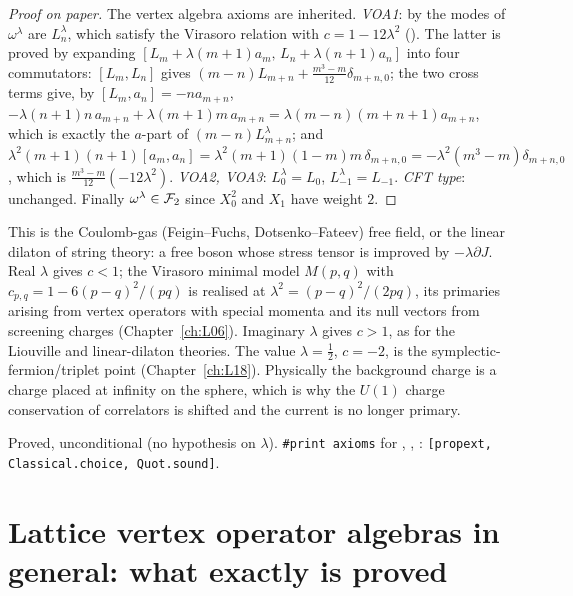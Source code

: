 \begin{proof}[Proof on paper]
The vertex algebra axioms are inherited. \emph{VOA1}: by  the modes of $\omega^\lambda$ are
$L^\lambda_n$, which satisfy the Virasoro relation with $c=1-12\lambda^2$ (). The latter is
proved by expanding $[L_m+\lambda(m+1)a_m,\,L_n+\lambda(n+1)a_n]$ into four commutators: $[L_m,L_n]$ gives
$(m-n)L_{m+n}+\frac{m^3-m}{12}\delta_{m+n,0}$; the two cross terms give, by $[L_m,a_n]=-na_{m+n}$,
$-\lambda(n+1)n\,a_{m+n}+\lambda(m+1)m\,a_{m+n}=\lambda(m-n)(m+n+1)a_{m+n}$, which is exactly the $a$-part of $(m-n)L^\lambda_{m+n}$; and
$\lambda^2(m+1)(n+1)[a_m,a_n]=\lambda^2(m+1)(1-m)m\,\delta_{m+n,0}=-\lambda^2(m^3-m)\delta_{m+n,0}$, which is
$\frac{m^3-m}{12}(-12\lambda^2)$. \emph{VOA2, VOA3}: $L^\lambda_0=L_0$, $L^\lambda_{-1}=L_{-1}$. \emph{CFT type}:
unchanged. Finally $\omega^\lambda\in\mathcal{F}_2$ since $X_0^2$ and $X_1$ have weight $2$.
\end{proof}

\begin{physics}
This is the Coulomb-gas (Feigin--Fuchs, Dotsenko--Fateev) free field, or the linear dilaton of string
theory: a free boson whose stress tensor is improved by $-\lambda\partial J$. Real $\lambda$ gives $c<1$; the
Virasoro minimal model $M(p,q)$ with $c_{p,q}=1-6(p-q)^2/(pq)$ is realised at $\lambda^2=(p-q)^2/(2pq)$, its
primaries arising from vertex operators with special momenta and its null vectors from screening charges
(Chapter~\ref{ch:L06}). Imaginary $\lambda$ gives $c>1$, as for the Liouville and linear-dilaton theories. The
value $\lambda=\frac12$, $c=-2$, is the symplectic-fermion/triplet point (Chapter~\ref{ch:L18}). Physically the
background charge is a charge placed at infinity on the sphere, which is why the $U(1)$ charge conservation of
correlators is shifted and the current is no longer primary.
\end{physics}

\begin{status}
Proved, unconditional (no hypothesis on $\lambda$). \texttt{\#print axioms} for ,
, : \texttt{[propext, Classical.choice, Quot.sound]}.
\end{status}

\section{Lattice vertex operator algebras in general: what exactly is proved}\label{l05:sec:general}

